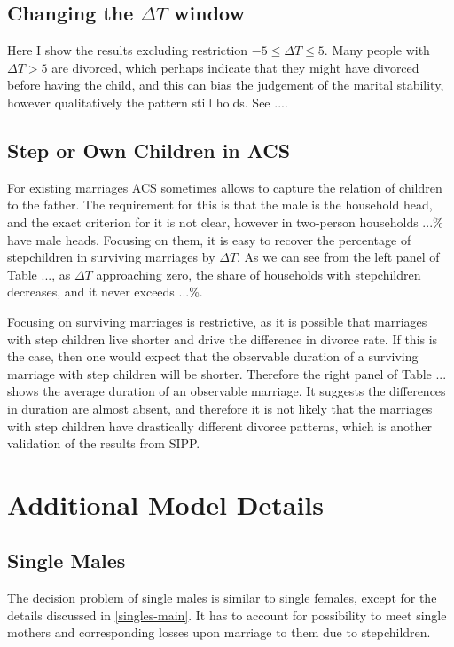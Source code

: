 \documentclass[12pt,letter]{article}
\begin{document}
\subsection{Changing the $\Delta T$ window\label{changing-window}}
Here I show the results excluding restriction $-5\leq \Delta T \leq 5$. Many people with $\Delta T > 5$ are divorced, which perhaps indicate that they might have divorced before having the child, and this can bias the judgement of the marital stability, however qualitatively the pattern still holds. See ....

\subsection{Step or Own Children in ACS}
For existing marriages ACS sometimes allows to capture the relation of children to the father. The requirement for this is that the male is the household head, and the exact criterion for it is not clear, however in two-person households ...\% have male heads. Focusing on them, it is easy to recover the percentage of stepchildren in surviving marriages by $\Delta T$. As we can see from the left panel of Table ..., as $\Delta T$ approaching zero, the share of households with stepchildren decreases, and it never exceeds ...\%. 

Focusing on surviving marriages is restrictive, as it is possible that marriages with step children live shorter and drive the difference in divorce rate. If this is the case, then one would expect that the observable duration of a surviving marriage with step children will be shorter. Therefore the right panel of Table ... shows the average duration of an observable marriage. It suggests the differences in duration are almost absent, and therefore it is not likely that the marriages with step children have drastically different divorce patterns, which is another validation of the results from SIPP.


\section{Additional Model Details}
\subsection{Single Males\label{single-male-appendix}}

The decision problem of single males is similar to single females, except for the details discussed in \ref{singles-main}. It has to account for possibility to meet single mothers and corresponding losses upon marriage to them due to stepchildren.
\end{document}
